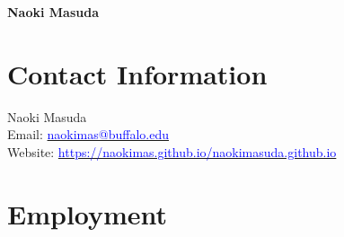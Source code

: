 \documentclass[11pt,letter]{article}
\def\name{Naoki Masuda}
\renewenvironment{itemize}{
  \begin{list}{}{
    \setlength{\leftmargin}{1.5em}
    \setlength{\itemsep}{0.25em}
    \setlength{\parskip}{0pt}
    \setlength{\parsep}{0.25em}
  }
}{
  \end{list}
}
\begin{document}
\centerline{\Large \bf \name}


\section*{\bf \normalsize Contact Information}

\begin{itemize}
\item Naoki Masuda\\
Email: \href{mailto:naokimas@buffalo.edu}{\textcolor{blue}{naokimas@buffalo.edu}}\\
Website: \href{https://naokimas.github.io/naokimasuda.github.io}{\textcolor{blue}{https://naokimas.github.io/naokimasuda.github.io}}\\
\end{itemize}


\section*{\bf \normalsize Employment}
\end{document}

